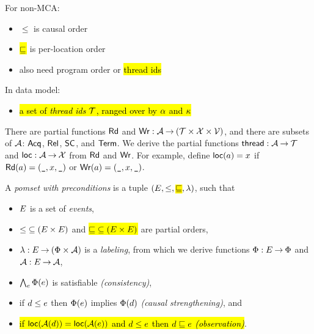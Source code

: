 For non-MCA:
\begin{itemize}
\item ${\le}$ is causal order
\item \hl{${\sqsubseteq}$} is per-location order
\item also need program order or \hl{thread ids}
\end{itemize}

In data model:
\begin{itemize}
\item \hl{a set of \emph{thread ids} $\mathcal{T}$, ranged over by $\alpha$ and
  $\kappa$}
\end{itemize}
There are partial functions $\mathsf{Rd}$ and
$\mathsf{Wr}: \mathcal{A} \mathbin\rightarrow (\mathcal{T} \times \mathcal{X} \times \mathcal{V})$, and there are subsets
of $\mathcal{A}$: $\mathsf{Acq}$, $\mathsf{Rel}$, $\mathsf{SC}$, and $\mathsf{Term}$.  We derive the partial
functions $\mathsf{thread}: \mathcal{A} \mathbin\rightarrow \mathcal{T}$ and $\mathsf{loc}: \mathcal{A} \mathbin\rightarrow \mathcal{X}$ from
$\mathsf{Rd}$ and $\mathsf{Wr}$.  For example, define $\mathsf{loc}(a)= x$ if
$\mathsf{Rd}(a) = (\texttt{\_},x,\texttt{\_})$ or
$\mathsf{Wr}(a) = (\texttt{\_},x,\texttt{\_})$.

\begin{definition}[\ref{def:mmpomset}]
  A \emph{pomset with preconditions} is a tuple
  $(\Event, {\le}, \hbox{\hl{$\leloc$}},
  \labeling)$, such that
  \begin{itemize}
  \item $E$ is a set of \emph{events},
  \item ${\le} \subseteq (E\times E)$ and \hl{${\sqsubseteq} \subseteq (E\times E)$} are partial orders, 
  \item $\lambda: E \mathbin\rightarrow (\Phi\times\mathcal{A})$ is a \emph{labeling},
    from which we derive functions $\Phi:E\mathbin\rightarrow\Phi$ and $\mathcal{A}:E\mathbin\rightarrow\mathcal{A}$,
  \item $\bigwedge_{e}\Phi(e)$ is satisfiable
    \emph{(consistency)},
  \item if $d\le e$ then $\Phi(e)$ implies
    $\Phi(d)$ \emph{(causal strengthening)}, and
  \item \hl{if $\mathsf{loc}(\mathcal{A}(d))=\mathsf{loc}(\mathcal{A}(e))$ and
    $d\le e$ then $d\sqsubseteq e$ \emph{(observation)}}.
  \end{itemize}
\end{definition}



